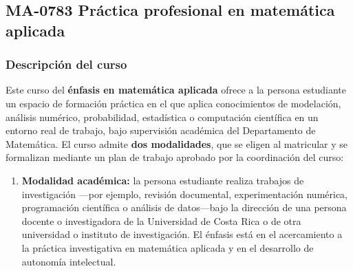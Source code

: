 \newpage
\subsection*{MA-0783 Práctica profesional en matemática aplicada}

\hypertarget{MA0783}{}
\begin{refsection}
\begin{table}[H]
\end{table}

\subsubsection*{Descripción del curso}

Este curso del \textbf{énfasis en matemática aplicada} ofrece a la persona estudiante un espacio de formación práctica en el que aplica conocimientos de modelación, análisis numérico, probabilidad, estadística o computación científica en un entorno real de trabajo, bajo supervisión académica del Departamento de Matemática. El curso admite \textbf{dos modalidades}, que se eligen al matricular y se formalizan mediante un plan de trabajo aprobado por la coordinación del curso:

\begin{enumerate}
\item \textbf{Modalidad académica:} la persona estudiante realiza trabajos de investigación ---por ejemplo, revisión documental, experimentación numérica, programación científica o análisis de datos---bajo la dirección de una persona docente o investigadora de la Universidad de Costa Rica o de otra universidad o instituto de investigación. El énfasis está en el acercamiento a la práctica investigativa en matemática aplicada y en el desarrollo de autonomía intelectual.


\end{enumerate}
\end{refsection}
